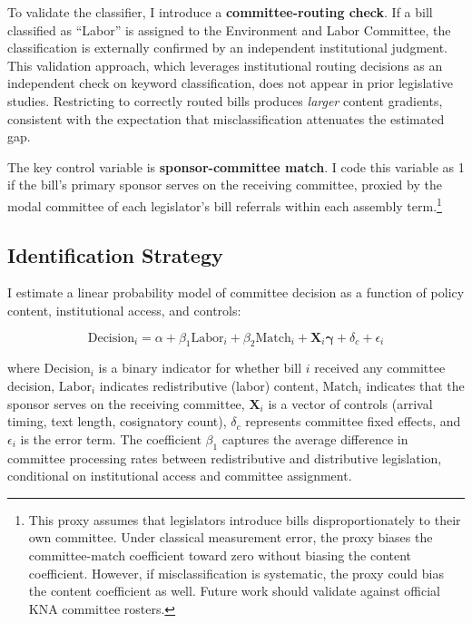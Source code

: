\documentclass[11pt]{article}
\begin{document}
To validate the classifier, I introduce a \textbf{committee-routing check}. If a bill classified as ``Labor'' is assigned to the Environment and Labor Committee, the classification is externally confirmed by an independent institutional judgment. This validation approach, which leverages institutional routing decisions as an independent check on keyword classification, does not appear in prior legislative studies. Restricting to correctly routed bills produces \emph{larger} content gradients, consistent with the expectation that misclassification attenuates the estimated gap.

The key control variable is \textbf{sponsor-committee match}. I code this variable as 1 if the bill's primary sponsor serves on the receiving committee, proxied by the modal committee of each legislator's bill referrals within each assembly term.\footnote{This proxy assumes that legislators introduce bills disproportionately to their own committee. Under classical measurement error, the proxy biases the committee-match coefficient toward zero without biasing the content coefficient. However, if misclassification is systematic, the proxy could bias the content coefficient as well. Future work should validate against official KNA committee rosters.}

\subsection{Identification Strategy}
\label{sec:ident}

I estimate a linear probability model of committee decision as a function of policy content, institutional access, and controls:

\begin{equation}
\text{Decision}_i = \alpha + \beta_1 \text{Labor}_i + \beta_2 \text{Match}_i + \mathbf{X}_i \boldsymbol{\gamma} + \delta_c + \epsilon_i
\label{eq:main}
\end{equation}

\noindent where $\text{Decision}_i$ is a binary indicator for whether bill $i$ received any committee decision, $\text{Labor}_i$ indicates redistributive (labor) content, $\text{Match}_i$ indicates that the sponsor serves on the receiving committee, $\mathbf{X}_i$ is a vector of controls (arrival timing, text length, cosignatory count), $\delta_c$ represents committee fixed effects, and $\epsilon_i$ is the error term. The coefficient $\beta_1$ captures the average difference in committee processing rates between redistributive and distributive legislation, conditional on institutional access and committee assignment.
\end{document}
